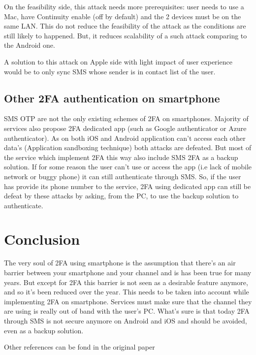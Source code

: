 \documentclass[11pt, a4paper,twocolumn]{article}
\begin{document}
On the feasibility side, this attack needs more prerequisites: user needs to use a Mac, have Continuity enable (off by default) and the 2 devices must be on the same LAN. This do not reduce the feasibility of the attack as the conditions are still likely to happened. But, it reduces scalability of a such attack comparing to the Android one.

A solution to this attack on Apple side with light impact of user experience would be to only sync SMS whose sender is in contact list of the user.

\subsection{Other 2FA authentication on smartphone}
SMS OTP are not the only existing schemes of 2FA on smartphones. Majority of services also propose 2FA dedicated app (such as Google authenticator or Azure authenticator). As on both iOS and Android application can't access each other data's (Application sandboxing technique) both attacks are defeated. But most of the service which implement 2FA this way also include SMS 2FA as a backup solution. If for some reason the user can't use or access the app (i.e lack of mobile network or buggy phone) it can still authenticate through SMS. So, if the user has provide its phone number to the service, 2FA using dedicated app can still be defeat by these attacks by asking, from the PC, to use the backup solution to authenticate.


\section{Conclusion}

The very soul of 2FA using smartphone is the assumption that there's an air barrier between your smartphone and your channel and is has been true for many years. But except for 2FA this barrier is not seen as a desirable feature anymore, and so it's been reduced over the year. This needs to be taken into account while implementing 2FA on smartphone. Services must make sure that the channel they are using is really out of band with the user's PC. What's sure is that today 2FA through SMS is not secure anymore on Android and iOS and should be avoided, even as a backup solution.

\clearpage
% 
%
\printbibliography

Other references can be fond in the original paper \cite{Base} 
\end{document}
